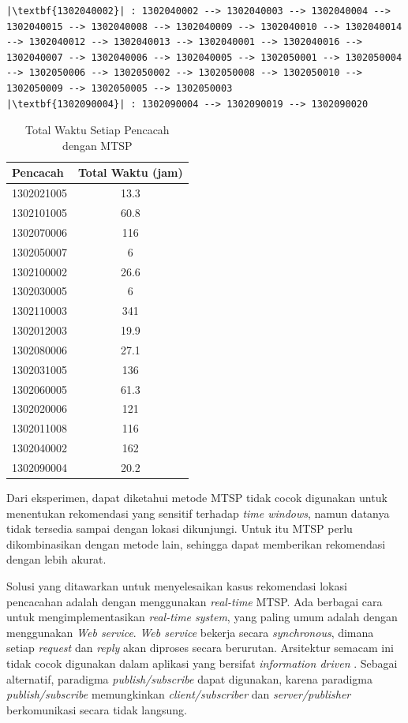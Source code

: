 \begin{listing}[h]
\begin{verbatim}
|\textbf{1302040002}| : 1302040002 --> 1302040003 --> 1302040004 --> 1302040015 --> 1302040008 --> 1302040009 --> 1302040010 --> 1302040014 --> 1302040012 --> 1302040013 --> 1302040001 --> 1302040016 --> 1302040007 --> 1302040006 --> 1302040005 --> 1302050001 --> 1302050004 --> 1302050006 --> 1302050002 --> 1302050008 --> 1302050010 --> 1302050009 --> 1302050005 --> 1302050003
|\textbf{1302090004}| : 1302090004 --> 1302090019 --> 1302090020
	\end{verbatim}
\end{listing}


\begin{table}
	\centering
	\caption{Total Waktu Setiap Pencacah dengan MTSP}
	\label{tbl:enumerators_total_time}
	\begin{tabular}{lc}
		\toprule
			Pencacah & Total Waktu (jam)\\
		\midrule
			1302021005 & 13.3\\
			1302101005 & 60.8\\
			1302070006 & 116\\
			1302050007 & 6\\
			1302100002 & 26.6\\
			1302030005 & 6\\
			1302110003 & 341\\
			1302012003 & 19.9\\
			1302080006 & 27.1\\
			1302031005 & 136\\
			1302060005 & 61.3\\
			1302020006 & 121\\
			1302011008 & 116\\
			1302040002 & 162\\
			1302090004 & 20.2\\
		\bottomrule
	\end{tabular}
\end{table}


Dari eksperimen, dapat diketahui metode MTSP tidak cocok digunakan untuk menentukan rekomendasi yang sensitif terhadap \textit{time windows}, namun datanya tidak tersedia sampai dengan lokasi dikunjungi. Untuk itu MTSP perlu dikombinasikan dengan metode lain, sehingga dapat memberikan rekomendasi dengan lebih akurat.


Solusi yang ditawarkan untuk menyelesaikan kasus rekomendasi lokasi pencacahan adalah dengan menggunakan \textit{real-time} MTSP. Ada berbagai cara untuk mengimplementasikan \textit{real-time system}, yang paling umum adalah dengan menggunakan \textit{Web service}. \textit{Web service} bekerja secara \textit{synchronous}, dimana setiap \textit{request} dan \textit{reply} akan diproses secara berurutan. Arsitektur semacam ini tidak cocok digunakan dalam aplikasi yang bersifat \textit{information driven} \citep{muhl_large-scale_2002}. Sebagai alternatif, paradigma \textit{publish/subscribe} dapat digunakan, karena paradigma \textit{publish/subscribe} memungkinkan \textit{client/subscriber} dan \textit{server/publisher} berkomunikasi secara tidak langsung.


